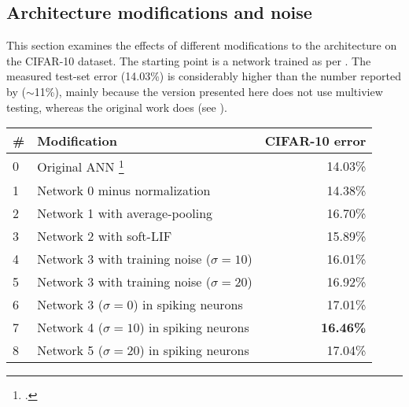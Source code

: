 \subsection{Architecture modifications and noise}

This section examines the effects of different modifications
to the architecture on the CIFAR-10 dataset.
The starting point is a network trained as per \textcite{Krizhevsky2012}.
The measured test-set error (14.03\%) is considerably higher than
the number reported by \textcite{Krizhevsky2012} ($\sim$11\%),
mainly because the version presented here does not use multiview testing,
whereas the original work does (see ).

\begin{table}
  \begin{minipage}{\columnwidth}
  \centering
  \begin{tabular}{llr}
    \# & Modification & CIFAR-10 error \\\hline\hline
    0 & Original ANN \footcite[Based on][]{Krizhevsky2012} & 14.03\% \\
    1 & Network 0 minus normalization & 14.38\% \\
    2 & Network 1 with average-pooling & 16.70\% \\\hline
    3 & Network 2 with soft-LIF & 15.89\% \\  %
    4 & Network 3 with training noise ($\sigma = 10$) & 16.01\% \\  %
    5 & Network 3 with training noise ($\sigma = 20$) & 16.92\% \\\hline  %
    6 & Network 3 ($\sigma = 0$) in spiking neurons & 17.01\% \\
    7 & Network 4 ($\sigma = 10$) in spiking neurons & \textbf{16.46\%} \\
    8 & Network 5 ($\sigma = 20$) in spiking neurons & 17.04\% \\
  \end{tabular}
  \end{minipage}
\end{table}

